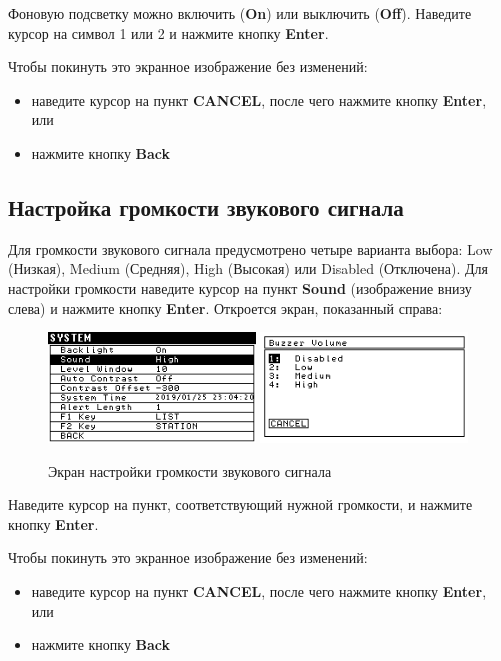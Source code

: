 Фоновую подсветку можно включить (\textbf{On}) или выключить (\textbf{Off}).
Наведите курсор на символ 1 или 2 и нажмите кнопку \textbf{Enter}.

Чтобы покинуть это экранное изображение без изменений:
\begin{itemize}
  \item наведите курсор на пункт \textbf{CANCEL}, после чего нажмите кнопку
    \textbf{Enter}, или

  \item нажмите кнопку \textbf{Back}
\end{itemize}

\subsection{Настройка громкости звукового сигнала}

Для громкости звукового сигнала предусмотрено четыре варианта выбора: Low
(Низкая), Medium (Средняя), High (Высокая) или Disabled (Отключена). Для
настройки громкости наведите курсор на пункт \textbf{Sound} (изображение внизу
слева) и нажмите кнопку \textbf{Enter}. Откроется экран, показанный справа:

\begin{figure}[H]
  \centering
  \includegraphics[width=0.49\textwidth]{figures/the_buzzer_volume_screen_1}
  \includegraphics[width=0.49\textwidth]{figures/the_buzzer_volume_screen_2}
  \caption{Экран настройки громкости звукового сигнала}
  \label{fig:the_buzzer_volume_screen}
\end{figure}

Наведите курсор на пункт, соответствующий нужной громкости, и нажмите кнопку
\textbf{Enter}.

Чтобы покинуть это экранное изображение без изменений:
\begin{itemize}
  \item наведите курсор на пункт \textbf{CANCEL}, после чего нажмите кнопку
    \textbf{Enter}, или

  \item нажмите кнопку \textbf{Back}
\end{itemize}

